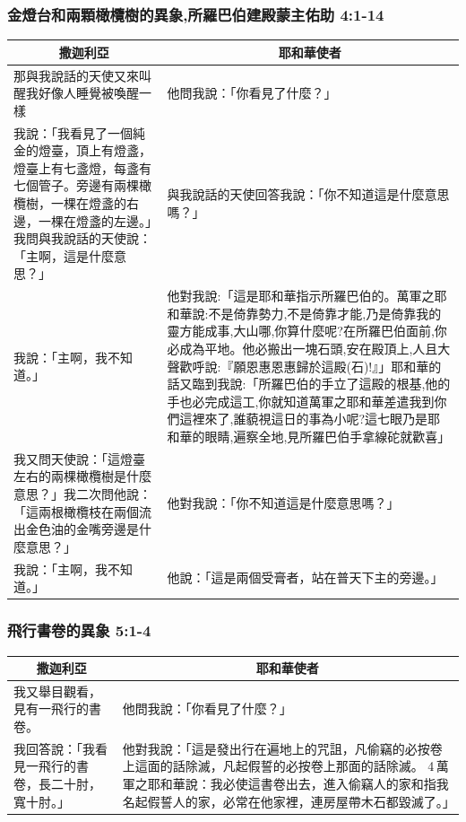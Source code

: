 \subsubsection{金燈台和兩顆橄欖樹的異象,所羅巴伯建殿蒙主佑助 4:1-14}
\begin{table}[H]
\centering
\begin{tabular}{p{8.25cm}|p{9.25cm}}\hline\hline
\multicolumn{1}{c|}{撒迦利亞}&\multicolumn{1}{c}{耶和華使者}\\\hline
那與我說話的天使又來叫醒我好像人睡覺被喚醒一樣
&他問我說：「你看見了什麼？」\\\hline
我說：「我看見了一個純金的燈臺，頂上有燈盞，燈臺上有七盞燈，每盞有七個管子。旁邊有兩棵橄欖樹，一棵在燈盞的右邊，一棵在燈盞的左邊。」我問與我說話的天使說：「主啊，這是什麼意思？」
&與我說話的天使回答我說：「你不知道這是什麼意思嗎？」\\\hline
我說：「主啊，我不知道。」 
&他對我說:「這是耶和華指示所羅巴伯的。萬軍之耶和華說:不是倚靠勢力,不是倚靠才能,乃是倚靠我的靈方能成事,大山哪,你算什麼呢?在所羅巴伯面前,你必成為平地。他必搬出一塊石頭,安在殿頂上,人且大聲歡呼說:『願恩惠恩惠歸於這殿(石)!』」耶和華的話又臨到我說:「所羅巴伯的手立了這殿的根基,他的手也必完成這工,你就知道萬軍之耶和華差遣我到你們這裡來了,誰藐視這日的事為小呢?這七眼乃是耶和華的眼睛,遍察全地,見所羅巴伯手拿線砣就歡喜」\\\hline
我又問天使說：「這燈臺左右的兩棵橄欖樹是什麼意思？」我二次問他說：「這兩根橄欖枝在兩個流出金色油的金嘴旁邊是什麼意思？」&他對我說：「你不知道這是什麼意思嗎？」\\\hline
我說：「主啊，我不知道。」&他說：「這是兩個受膏者，站在普天下主的旁邊。」\\\hline
\end{tabular}
\end{table}

\subsubsection{飛行書卷的異象 5:1-4}
\begin{table}[H]
\centering
\begin{tabular}{p{3.25cm}|p{12.25cm}}\hline\hline
\multicolumn{1}{c|}{撒迦利亞}&\multicolumn{1}{c}{耶和華使者}\\\hline
我又舉目觀看，見有一飛行的書卷。 &他問我說：「你看見了什麼？」\\\hline
我回答說：「我看見一飛行的書卷，長二十肘，寬十肘。」&他對我說：「這是發出行在遍地上的咒詛，凡偷竊的必按卷上這面的話除滅，凡起假誓的必按卷上那面的話除滅。 4 萬軍之耶和華說：我必使這書卷出去，進入偷竊人的家和指我名起假誓人的家，必常在他家裡，連房屋帶木石都毀滅了。」\\\hline
\end{tabular}
\end{table}


